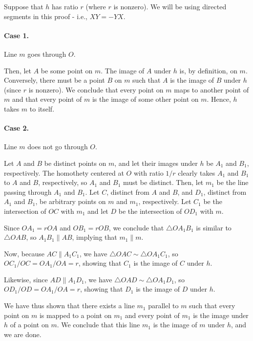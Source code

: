 \begin{mdsoln}

    Suppose that $h$ has ratio $r$ (where $r$ is nonzero). We will be using directed segments in this proof - i.e., $XY=-YX$.
    
    \paragraph{Case 1.} Line $m$ goes through $O$.

    Then, let $A$ be some point on $m$. The image of $A$ under $h$ is, by definition, on $m$. Conversely, there must be a point $B$ on $m$ such that $A$ is the image of $B$ under $h$ (since $r$ is nonzero). We conclude that every point on $m$ maps to another point of $m$ and that every point of $m$ is the image of some other point on $m$. Hence, $h$ takes $m$ to itself.

    \paragraph{Case 2.} Line $m$ does not go through $O$.

    Let $A$ and $B$ be distinct points on $m$, and let their images under $h$ be $A_1$ and $B_1$, respectively. The homothety centered at $O$ with ratio $1/r$ clearly takes $A_1$ and $B_1$ to $A$ and $B$, respectively, so $A_1$ and $B_1$ must be distinct. Then, let $m_1$ be the line passing through $A_1$ and $B_1$. Let $C$, distinct from $A$ and $B$, and $D_1$, distinct from $A_1$ and $B_1$, be arbitrary points on $m$ and $m_1$, respectively. Let $C_1$ be the intersection of $OC$ with $m_1$ and let $D$ be the intersection of $OD_1$ with $m$.

    Since $OA_1=rOA$ and $OB_1=rOB$, we conclude that $\triangle OA_1B_1$ is similar to $\triangle OAB$, so $A_1B_1\parallel AB$, implying that $m_1\parallel m$.

    Now, because $AC\parallel A_1C_1$, we have $\triangle OAC\sim \triangle OA_1C_1$, so $OC_1/OC=OA_1/OA=r$, showing that $C_1$ is the image of $C$ under $h$.

    Likewise, since $AD\parallel A_1D_1$, we have $\triangle OAD\sim \triangle OA_1D_1$, so $OD_1/OD=OA_1/OA=r$, showing that $D_1$ is the image of $D$ under $h$.

    We have thus shown that there exists a line $m_1$ parallel to $m$ such that every point on $m$ is mapped to a point on $m_1$ and every point of $m_1$ is the image under $h$ of a point on $m$. We conclude that this line $m_1$ is the image of $m$ under $h$, and we are done.
\end{mdsoln}



